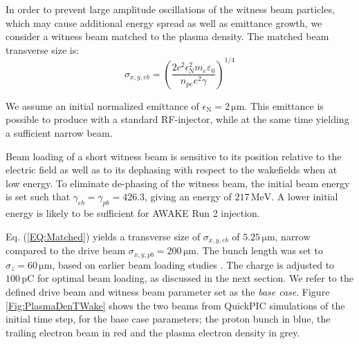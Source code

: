 \documentclass[aps,prstab,reprint,amsmath,amssymb,groupedaddress]{revtex4-1}
\newcommand{\unit}[1]{\,\mathrm{#1}}
\begin{document}
In order to prevent large amplitude oscillations of the witness beam particles, which may cause additional energy spread
as well as emittance growth, we %
consider a witness beam matched to the plasma density.  
The matched beam transverse size is:
\begin{equation}
    \sigma_{x,y,eb}=\left(\frac{2c^{2}\epsilon_{\mathrm{N}}^{2}m_{e}\varepsilon_{0}}{n_{pe}e^{2}\gamma}\right)^{1/4}
    \label{EQ:Matched}
\end{equation}

We %
assume an initial normalized emittance of $\epsilon_{\mathrm{N}} = 2\unit{\mu m}$. This emittance is possible to produce
with a standard RF-injector, while at the same time yielding a sufficient narrow beam. %

Beam loading of a short witness beam is sensitive to its position relative to the electric field \cite{tzoufras:2009}
as well as to its dephasing with respect to the wakefields when at low energy.
To eliminate %
de-phasing of the witness beam, %
the initial beam energy %
is set such
that $\gamma_{eb} = \gamma_{pb} = 426.3$, giving an energy of $217\unit{MeV}$.  A lower initial energy is likely to be
sufficient for AWAKE Run 2 injection. 

Eq. (\ref{EQ:Matched}) yields a transverse size of $\sigma_{x,y,eb}$ of $5.25\unit{\mu m}$, narrow compared to the drive
beam $\sigma_{x,y,pb} = 200\unit{\mu m}$. The bunch length was set to $\sigma_{z}=60\unit{\mu m}$, based on earlier
beam loading studies \cite{berglyd_olsen:2016}. The charge %
is adjusted to $100\unit{pC}$ for optimal beam loading, as discussed in the next section. We refer to the defined drive
beam and witness beam parameter set as the \emph{base case}.  
Figure \ref{Fig:PlasmaDenTWake} shows the two beams from QuickPIC simulations of the initial time step, for the base
case parameters; the proton bunch in blue, the trailing electron beam in red and the plasma electron density in grey. 
\end{document}
